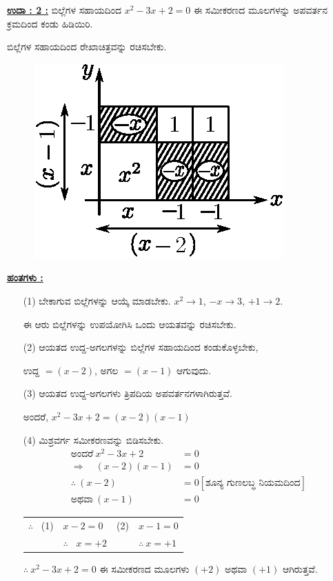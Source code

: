 \noindent
{\textbf{\underline{ಉದಾ : 2 :}}} ಬಿಲ್ಲೆಗಳ ಸಹಾಯದಿಂದ $x^2 - 3x + 2 = 0$ ಈ ಸಮೀಕರಣದ ಮೂಲ\-ಗಳನ್ನು ಅಪವರ್ತನ ಕ್ರಮದಿಂದ ಕಂಡು ಹಿಡಿಯಿರಿ. 

\smallskip

ಬಿಲ್ಲೆಗಳ ಸಹಾಯದಿಂದ ರೇಖಾಚಿತ್ರವನ್ನು ರಚಿಸಬೇಕು.
\begin{figure}[H]
\centering
\includegraphics{src/figure/chap3/fig3-52.eps}
\end{figure}

\noindent
{\textbf{\underline{ಹಂತಗಳು :}}}
\begin{itemize}
\item [(1)] ಬೇಕಾಗುವ ಬಿಲ್ಲೆಗಳನ್ನು ಆಯ್ಕೆ ಮಾಡಬೇಕು. $x^2 \rightarrow 1$, $-x \rightarrow 3$, $+1 \rightarrow 2$.

ಈ ಆರು ಬಿಲ್ಲೆಗಳನ್ನು ಉಪಯೋಗಿಸಿ ಒಂದು ಆಯತವನ್ನು ರಚಿಸಬೇಕು. 
\smallskip
\item [(2)] ಆಯತದ ಉದ್ದ-ಅಗಲಗಳನ್ನು ಬಿಲ್ಲೆಗಳ ಸಹಾಯದಿಂದ ಕಂಡುಕೊಳ್ಳಬೇಕು, 

ಉದ್ದ $= (x-2)$, ಅಗಲ $= (x-1)$ ಆಗುವುದು. 

\smallskip
\item [(3)] ಆಯತದ ಉದ್ದ-ಅಗಲಗಳು ತ್ರಿಪದಿಯ ಅಪವರ್ತನಗಳಾಗಿರುತ್ತವೆ. 

ಅಂದರೆ, $x^2-3x+2 = (x-2)(x-1)$
\smallskip
\item [(4)] ಮಿಶ್ರವರ್ಗ ಸಮೀಕರಣವನ್ನು ಬಿಡಿಸಬೇಕು. 
\begin{align*}
\text{ಅಂದರೆ}~ x^2 - 3x + 2 & = 0\\
\Rightarrow\quad (x-2)(x-1) & = 0\\
\therefore~ (x-2) & = 0\tag{1} [\text{ಶೂನ್ಯ ಗುಣಲಬ್ಧ ನಿಯಮದಿಂದ}]\\
\text{ಅಥವಾ}~ (x - 1) & = 0\tag{2}
\end{align*}

\begin{tabular}{llll}
$\therefore$~ (1) & $x - 2 = 0$ & (2) & $x-1 = 0$\\
& $\therefore$~ $x = +2$ & &$\therefore~ x = +1$
\end{tabular}

\smallskip

$\therefore~ x^2-3x+2 = 0$ ಈ ಸಮೀಕರಣದ ಮೂಲಗಳು $(+2)$ ಅಥವಾ $(+1)$ ಆಗಿರುತ್ತವೆ.
\end{itemize}

